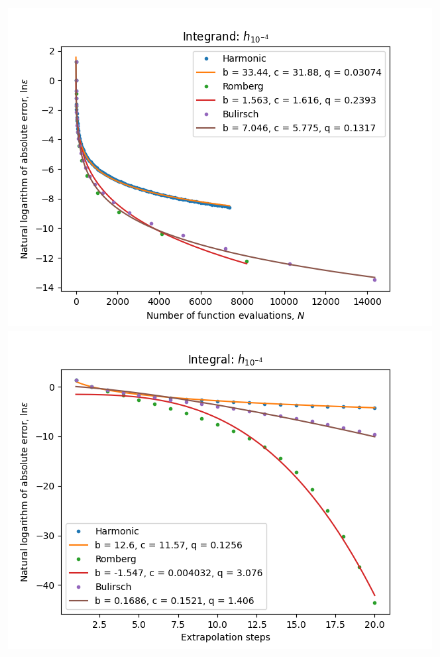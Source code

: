 \begin{figure}[H]
\centering
\begin{minipage}{0.45\textwidth}
\centering
\includegraphics[scale=0.45]{../results/romberg_plots/h_tenthousandth_hp_trend.png}
\end{minipage}
\begin{minipage}{0.45\textwidth}
\centering
\includegraphics[scale=0.45]{../results/romberg_plots/h_tenthousandth_hp_steps.png}
\end{minipage}
\end{figure}

